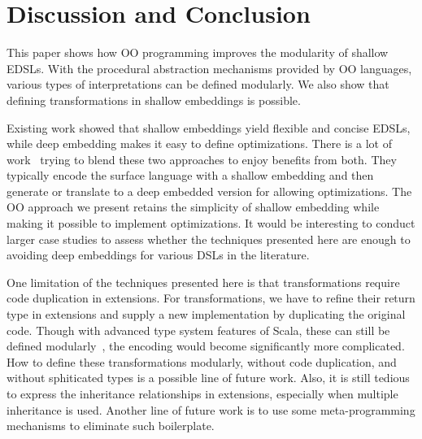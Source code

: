 \section{Discussion and Conclusion}
This paper shows how OO programming improves the modularity of shallow EDSLs.
With the procedural abstraction mechanisms provided by OO languages, various types of
interpretations can be defined modularly. We also show that defining
transformations in shallow embeddings is possible.


Existing work showed that shallow embeddings yield flexible and concise EDSLs, while deep embedding makes
it easy to define optimizations.
There is a lot of work~\cite{svenningsson2012combining,
  Jovanovic:2014:YCD:2658761.2658771, scherr2014implicit} trying to blend these two
approaches to enjoy benefits from both.
They typically encode the surface language with a shallow embedding and
then generate or translate to a deep embedded version for allowing optimizations.
The OO approach we present retains the simplicity of shallow embedding while
making it possible to implement optimizations. It would be interesting
to conduct larger case studies to assess whether the techniques
presented here are enough to avoiding deep embeddings for various DSLs
in the literature.

One limitation of the techniques presented here is that
transformations require code duplication in extensions.  For
transformations, we have to refine their return type in extensions and
supply a new implementation by duplicating the original code. 
Though with advanced type system features of Scala, these can still be defined
modularly~\cite{zenger05independentlyextensible}, the encoding would
become significantly more complicated.
How to define these transformations modularly, without code
duplication, and without sphiticated types
is a possible line of future work.  Also, it is still tedious to
express the inheritance relationships in extensions, especially when
multiple inheritance is used. Another line of future work is to use
some meta-programming mechanisms to eliminate such boilerplate.
